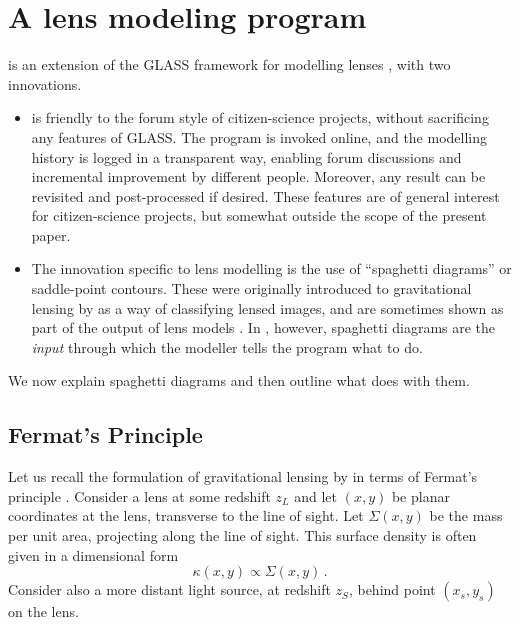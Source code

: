 \section{A lens modeling program}

\spl is an extension of the GLASS framework for modelling lenses
\citep{2014arXiv1401.7990C}, with two innovations.
\begin{itemize}
\item \spl is friendly to the forum style of citizen-science projects,
  without sacrificing any features of GLASS.  The program is invoked
  online, and the modelling history is logged in a transparent way,
  enabling forum discussions and incremental improvement by different
  people.  Moreover, any result can be revisited and post-processed if
  desired.  These features are of general interest for citizen-science
  projects, but somewhat outside the scope of the present paper.
\item The innovation specific to lens modelling is the use of
  ``spaghetti diagrams'' or saddle-point contours.  These were
  originally introduced to gravitational lensing by
  \cite{1986ApJ...310..568B} as a way of classifying lensed images,
  and are sometimes shown as part of the output of lens models
  \citep[for
    example][]{2001ApJ...557..594R,2003ApJ...590...39K,Lubini2012}.
  In \spl, however, spaghetti diagrams are the {\em input\/} through
  which the modeller tells the program what to do.
\end{itemize}

We now explain spaghetti diagrams and then outline what \spl does with
them.

\subsection{Fermat's Principle} \label{sec:Fermat}

Let us recall the formulation of gravitational lensing by
\cite{1986ApJ...310..568B} in terms of Fermat's principle .  Consider
a lens at some redshift $z_L$ and let $(x,y)$ be planar coordinates at
the lens, transverse to the line of sight.  Let $\Sigma(x,y)$ be the
mass per unit area, projecting along the line of sight.  This surface
density is often given in a dimensional form
\begin{equation} \label{eq:kappa}
\kappa(x,y) \propto \Sigma(x,y) \,.
\end{equation}
Consider also a more distant light source, at redshift $z_S$, behind
point $(x_s,y_s)$ on the lens.

